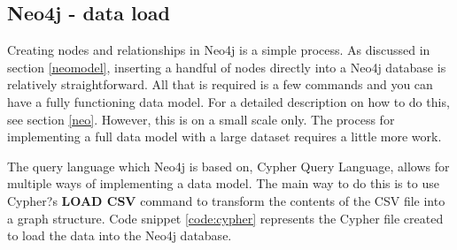 \subsection*{Neo4j - data load}
Creating nodes and relationships in Neo4j is a simple process. As discussed in section \ref{neomodel}, inserting a handful of nodes directly into a Neo4j database is relatively straightforward. All that is required is a few commands and you can have a fully functioning data model. For a detailed description on how to do this, see section \ref{neo}. However, this is on a small scale only. The process for implementing a full data model with a large dataset requires a little more work.

The query language which Neo4j is based on, Cypher Query Language, allows for multiple ways of implementing a data model. The main way to do this is to use Cypher?s \textbf{LOAD CSV} command to transform the contents of the CSV file into a graph structure. Code snippet \ref{code:cypher} represents the Cypher file created to load the data into the Neo4j database.

